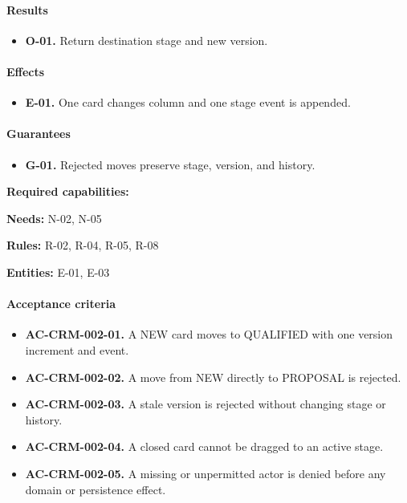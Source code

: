 \documentclass[10pt,a4paper]{article}
\begin{document}
\paragraph{Results}

\begin{itemize}

\item \textbf{O-01.} Return destination stage and new version.

\end{itemize}

\paragraph{Effects}

\begin{itemize}

\item \textbf{E-01.} One card changes column and one stage event is appended.

\end{itemize}

\paragraph{Guarantees}

\begin{itemize}

\item \textbf{G-01.} Rejected moves preserve stage, version, and history.

\end{itemize}

\textbf{Required capabilities:}

\textbf{Needs:} N-02, N-05

\textbf{Rules:} R-02, R-04, R-05, R-08

\textbf{Entities:} E-01, E-03

\paragraph{Acceptance criteria}

\begin{itemize}

\item \textbf{AC-CRM-002-01.} A NEW card moves to QUALIFIED with one version increment and event.

\item \textbf{AC-CRM-002-02.} A move from NEW directly to PROPOSAL is rejected.

\item \textbf{AC-CRM-002-03.} A stale version is rejected without changing stage or history.

\item \textbf{AC-CRM-002-04.} A closed card cannot be dragged to an active stage.

\item \textbf{AC-CRM-002-05.} A missing or unpermitted actor is denied before any domain or persistence effect.

\end{itemize}
\end{document}
